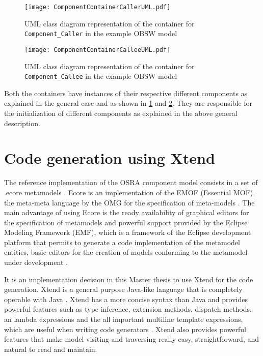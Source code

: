 \begin{figure}[h]
	\centering
	\texttt{[image: ComponentContainerCallerUML.pdf]}
	\caption{UML class diagram representation of the container for \texttt{Component\allowbreak \_Caller} in the example OBSW model}
	\label{fig: Component container caller UML}
\end{figure}

\begin{figure}[h]
	\centering
	\texttt{[image: ComponentContainerCalleeUML.pdf]}
	\caption{UML class diagram representation of the container for \texttt{Component\allowbreak \_Callee} in the example OBSW model}
	\label{fig: Component container callee UML}
\end{figure}

Both the containers have instances of their respective different components as explained in the general case and as shown in \cref{fig: Component container caller UML} and \cref{fig: Component container callee UML}. They are responsible for the initialization of different components as explained in the above general description.  

\section{Code generation using Xtend}
\label{section: code generation}
The reference implementation of the OSRA component model consists in a set of .ecore metamodels \cite{SpecMetamodel}. Ecore is an implementation of the EMOF (Essential MOF), the meta-meta language by the OMG for the specification of meta-models \cite{SpecMetamodel}. The main advantage of using Ecore is the ready availability of graphical editors for the specification of metamodels and powerful support provided by the Eclipse Modeling Framework (EMF), which is a framework of the Eclipse development platform that permits to generate a code implementation of the metamodel entities, basic editors for the creation of models conforming to the metamodel under development \cite{SpecMetamodel}. 

It is an implementation decision in this Master thesis to use Xtend for the code generation. Xtend is a general purpose Java-like language that is completely operable with Java \cite{Xtend,XtendDoc}. Xtend has a more concise syntax than Java and provides powerful features such as type inference, extension methods, dispatch methods, an lambda expressions and the all important multiline template expressions, which are useful when writing code generators \cite{Xtend,XtendDoc}. Xtend also provides powerful features that make model visiting and traversing really easy, straightforward, and natural to read and maintain. 

